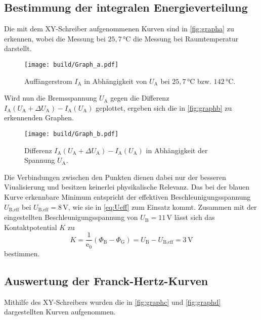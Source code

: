 \subsection{Bestimmung der integralen Energieverteilung}

Die mit dem XY-Schreiber aufgenommenen Kurven sind in \autoref{fig:grapha} zu erkennen, wobei die Messung bei $25,7 \,\unit{\celsius}$ die Messung bei Raumtemperatur darstellt.

\begin{figure}[H]
    \centering
    \texttt{[image: build/Graph\_a.pdf]}
    \caption{Auffängerstrom $I_\text{A}$ in Abhängigkeit von $U_\text{A}$ bei $25,7 \,\unit{\celsius}$ bzw. $142 \,\unit{\celsius}$.}
    \label{fig:grapha}
\end{figure}

Wird nun die Bremsspannung $U_\text{A}$ gegen die Differenz $I_\text{A}(U_\text{A}+ \Delta U_\text{A}) - I_\text{A}(U_\text{A})$ geplottet, ergeben sich die in \autoref{fig:graphb} zu erkennenden Graphen.

\begin{figure}[H]
    \centering
    \texttt{[image: build/Graph\_b.pdf]}
    \caption{Differenz $I_\text{A}(U_\text{A}+ \Delta U_\text{A}) - I_\text{A}(U_\text{A})$ in Abhängigkeit der Spannung $U_\text{A}$.}
    \label{fig:graphb}
\end{figure}

Die Verbindungen zwischen den Punkten dienen dabei nur der besseren Viualisierung und besitzen keinerlei physikalische Relevanz.
Das bei der blauen Kurve erkennbare Minimum entspricht der effektiven Beschleunigungsspannung $U_{\text{B},\text{eff}}$ bei $U_{\text{B},\text{eff}} = 8 \,\unit{\volt}$, wie sie in \eqref{eq:Ueff} zum Einsatz kommt.
Zusammen mit der eingestellten Beschleunigungsspannung von $U_\text{B} = 11 \,\unit{\volt}$ lässt sich das Kontaktpotential $K$ zu
\begin{equation*}
    K = \frac{1}{\text{e}_0} (\Phi_\text{B} - \Phi_\text{G}) = U_\text{B} - U_{\text{B},\text{eff}} = 3 \,\unit{\volt} %
\end{equation*}
bestimmen.


\subsection{Auswertung der Franck-Hertz-Kurven}

Mithilfe des XY-Schreibers wurden die in \autoref{fig:graphc} und \autoref{fig:graphd} dargestellten Kurven aufgenommen.

